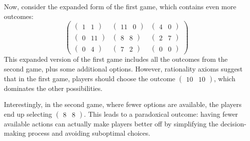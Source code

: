 \begin{example}
    Now, consider the expanded form of the first game, which contains even more outcomes:
    \[\begin{pmatrix} \begin{pmatrix} 1 & 1 \end{pmatrix} & \begin{pmatrix} 11 & 0 \end{pmatrix} & \begin{pmatrix} 4 & 0 \end{pmatrix} \\ \begin{pmatrix} 0 & 11 \end{pmatrix} & \begin{pmatrix} 8 & 8 \end{pmatrix} & \begin{pmatrix} 2 & 7 \end{pmatrix} \\ \begin{pmatrix} 0 & 4 \end{pmatrix} & \begin{pmatrix} 7 & 2 \end{pmatrix} & \begin{pmatrix} 0 & 0 \end{pmatrix} \end{pmatrix}\]
    This expanded version of the first game includes all the outcomes from the second game, plus some additional options. 
    However, rationality axioms suggest that in the first game, players should choose the outcome $\begin{pmatrix} 10 & 10 \end{pmatrix}$, which dominates the other possibilities.

    Interestingly, in the second game, where fewer options are available, the players end up selecting $\begin{pmatrix} 8 & 8 \end{pmatrix}$.
    This leads to a paradoxical outcome: having fewer available actions can actually make players better off by simplifying the decision-making process and avoiding suboptimal choices.
\end{example}
